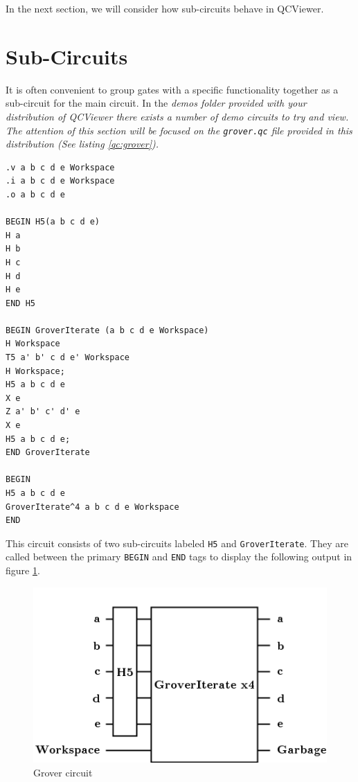 \documentclass[10pt]{article}
\theoremstyle{definition}
\begin{document}
In the next section, we will consider how sub-circuits behave in QCViewer.

\section{Sub-Circuits}\label{sec:SubCircuits}

It is often convenient to group gates with a specific functionality together as a sub-circuit for the main circuit. In the \em demos \em folder provided with your distribution of QCViewer there exists a number of demo circuits to try and view. The attention of this section will be focused on the \verb+grover.qc+ file provided in this distribution (See listing \ref{qc:grover}).

\begin{program}
\caption{ .qc file for the grover circuit}
\label{qc:grover}
\begin{verbatim}
.v a b c d e Workspace
.i a b c d e Workspace
.o a b c d e

BEGIN H5(a b c d e)
H a
H b
H c
H d
H e
END H5

BEGIN GroverIterate (a b c d e Workspace)
H Workspace
T5 a' b' c d e' Workspace
H Workspace;
H5 a b c d e
X e
Z a' b' c' d' e
X e
H5 a b c d e;
END GroverIterate

BEGIN
H5 a b c d e
GroverIterate^4 a b c d e Workspace 
END
\end{verbatim}
\end{program}

This circuit consists of two sub-circuits labeled \verb+H5+ and \verb+GroverIterate+. 
They are called between the primary \verb+BEGIN+ and \verb+END+ tags to display the 
following output in figure \ref{f:grover}.

\begin{figure}
\capstart
\centering
\includegraphics[scale=.5]{Figures/SubCircuits/GroverCircuit}
\caption{Grover circuit}
\label{f:grover}
\end{figure}
\end{document}
